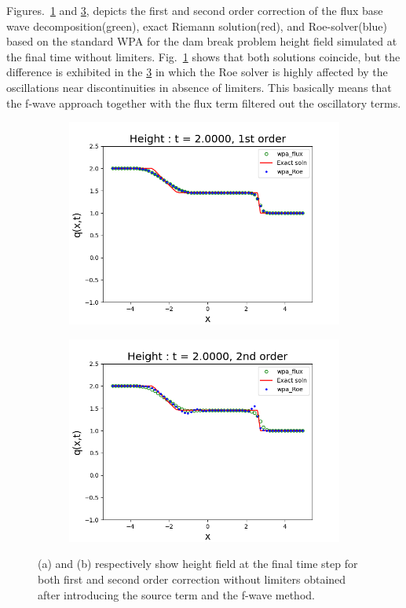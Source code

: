 \documentclass[12pt,a4paper]{article}
\begin{document}
	  Figures.~\ref{fig:f1} and \ref{fig:f2}, depicts the first and second order correction of the flux base wave decomposition(green), exact Riemann solution(red), and Roe-solver(blue) based on the standard WPA for the dam break problem height field simulated at the final time without limiters. Fig.~\ref{fig:f1}  shows that both solutions coincide, but the difference is exhibited in the \ref{fig:f2} in which the Roe solver is highly affected by the oscillations near discontinuities in absence of limiters. This basically means that the f-wave approach together with the flux term filtered out the oscillatory terms.
	
	\begin{figure}[H]
		\begin{subfigure}[b]{0.5\textwidth}
			\centering
			\includegraphics[width=1.0\linewidth]{images/f1}
			\caption{}
			\label{fig:f1}
		\end{subfigure}
		\begin{subfigure}[b]{0.5\textwidth}
			\centering
			\includegraphics[width=1.0\linewidth]{images/f2}
			\caption{}
			\label{fig:f2}
		\end{subfigure}
		\caption{(a) and (b) respectively show height field at the final time step for both first and second order correction without limiters obtained after introducing the source term and the f-wave method. }
	\end{figure}
	
\end{document}
